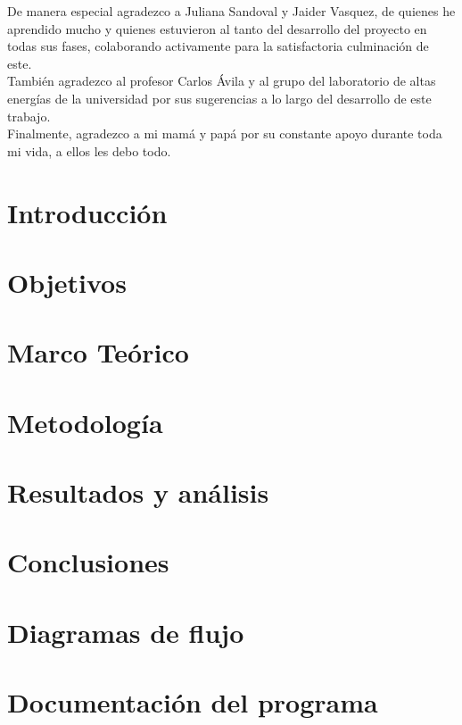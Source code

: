 \documentclass[12pt]{report}
\theoremstyle{definition}
\begin{document}
De manera especial agradezco a Juliana Sandoval y Jaider Vasquez, de quienes he aprendido mucho y quienes estuvieron al tanto del desarrollo del proyecto en todas sus fases, colaborando activamente para la satisfactoria culminación de este.\\

También agradezco al profesor Carlos \'Avila y al grupo del laboratorio de altas energías de la universidad por sus sugerencias a lo largo del desarrollo de este trabajo.\\

Finalmente, agradezco a mi mamá y papá por su constante apoyo durante toda mi vida, a ellos les debo todo.  

\tableofcontents

\listoffigures

\chapter{Introducción}


\chapter{Objetivos}\label{chp:objetivos}


\chapter{Marco Teórico}\label{chp:teorico}


\chapter{Metodología}\label{chp:metodologia}


\chapter{Resultados y análisis}\label{chp:resultados}



\chapter{Conclusiones}


\begin{appendices}
	\chapter{Diagramas de flujo}
	
	\chapter{Documentación del programa}
	
\end{appendices}
\nocite{*}


\end{document}
